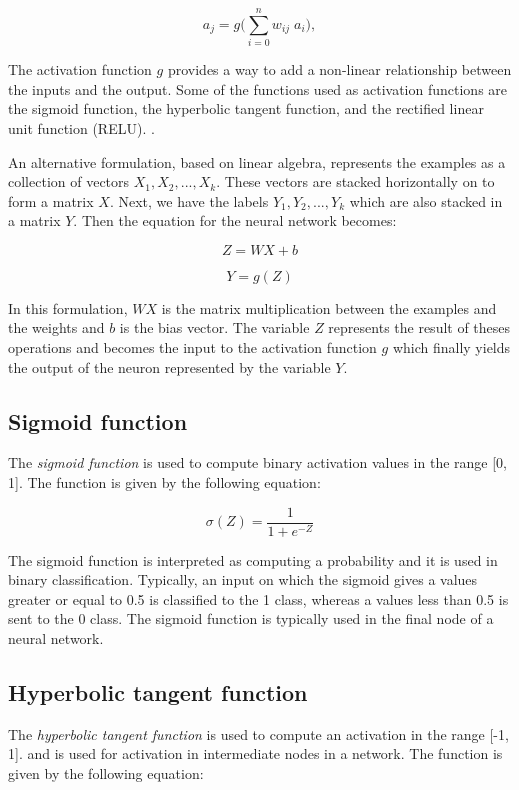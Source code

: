 \documentclass[12pt]{report}
\begin{document}
	\begin{equation}
	a_j=g\Biggl(\sum_{i=0}^{n} w_{ij}\; a_i\Biggr),
	\label{equation_1}
	\end{equation}
	
	The activation function $g$ provides a way to add a non-linear relationship between the inputs and the output. Some of the functions used as activation functions are the sigmoid function, the hyperbolic tangent function, and the rectified linear unit function (RELU). \cite{Goodfellow2016}. 
	
	An alternative formulation, based on linear algebra, represents the examples as a collection of vectors $X_1, X_2, ..., X_k$. These vectors 
	are stacked horizontally on to form a matrix $X$. Next, we have the labels $Y_1, Y_2, ..., Y_k$ which are also stacked in a matrix $Y$. 
	Then the equation for the neural network becomes: 

	\begin{equation}
	Z = WX + b
	\end{equation}
	
	\begin{equation}
	Y = g(Z)
	\end{equation}

	In this formulation, $WX$ is the matrix multiplication between the examples and the weights and $b$ is the bias vector. The variable $Z$ represents the 
	result of theses operations and becomes the input to the activation function $g$ which finally yields the output of the neuron represented by the variable $Y$.
	
	\subsection{Sigmoid function}
	The {\em sigmoid function} is used to compute binary activation values in the range [0, 1]. The function is given by the following equation:

	\begin{equation}
	\sigma(Z) = \frac{1}{1 + e^{-Z}}
	\end{equation}

	The sigmoid function is interpreted as computing a probability and it is used in binary classification. Typically, an input on which the sigmoid  gives a values greater or equal to 0.5 is classified to the 1 class, whereas a values less than 0.5 is sent to the 0 class. The sigmoid function is typically used 
	in the final node of a neural network. 
	
	\subsection{Hyperbolic tangent function}
	The {\em hyperbolic tangent function} is used to compute an activation in the range [-1, 1]. and is used for activation in intermediate nodes 
	in a network. The function is given by the following equation:
	
\end{document}
